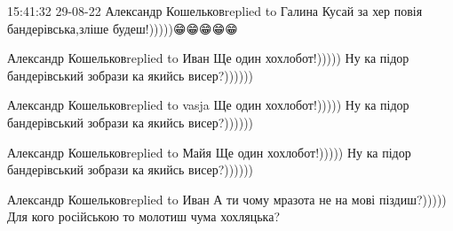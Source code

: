  
 
 
 
 

15:41:32 29-08-22
Александр Кошельковreplied to Галина
Кусай за хер повія бандерівська,зліше будеш!)))))😁😁😁😁😁

Александр Кошельковreplied to Иван
Ще один хохлобот!))))) Ну ка підор бандерівський зобрази ка якийсь висер?))))))

Александр Кошельковreplied to vasja
Ще один хохлобот!))))) Ну ка підор бандерівський зобрази ка якийсь висер?))))))

Александр Кошельковreplied to Майя
Ще один хохлобот!))))) Ну ка підор бандерівський зобрази ка якийсь висер?))))))

Александр Кошельковreplied to Иван
А ти чому мразота не на мові піздиш?))))) Для кого російською то молотиш чума хохляцька?
